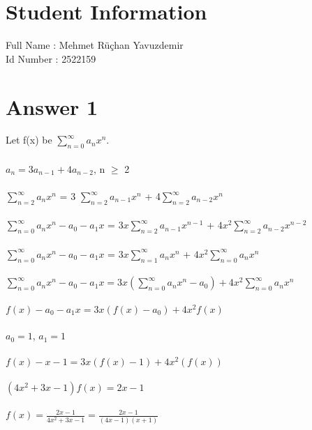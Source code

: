 \documentclass[12pt]{article}
\begin{document}
\section*{Student Information } 

Full Name : Mehmet Rüçhan Yavuzdemir \\
Id Number : 2522159 \\

\section*{Answer 1}

Let f(x) be  $\sum_{n=0}^{\infty} a_n x^n$.\\\\

$a_n = 3a_{n-1} + 4a_{n-2}$, n $\geq$ 2\\\\

$\sum_{n=2}^{\infty} a_n x^n$ = 3 $\sum_{n=2}^{\infty} a_{n-1}x^n$ + 4$\sum_{n=2}^{\infty} a_{n-2} x^n$\\\\

$\sum_{n=0}^{\infty} a_n x^n - a_0 - a_1x$  = $3x \sum_{n=2}^{\infty} a_{n-1}x^{n-1}$ + $4x^2\sum_{n=2}^{\infty} a_{n-2} x^{n-2}$\\\\

$\sum_{n=0}^{\infty} a_n x^n - a_0 - a_1x$  = $3x \sum_{n=1}^{\infty} a_{n}x^{n}$ + $4x^2\sum_{n=0}^{\infty} a_{n} x^{n}$\\\\

$\sum_{n=0}^{\infty} a_n x^n- a_0 - a_1x = 3x(\sum_{n=0}^{\infty} a_n x^n-a_0) + 4x^2\sum_{n=0}^{\infty} a_n x^n$\\\\

$f(x)- a_0 - a_1x = 3x(f(x)-a_0) + 4x^2f(x)$\\\\

$a_0 = 1$, $a_1 = 1$\\\\

$f(x) -x -1= 3x(f(x)-1) + 4x^2(f(x))$\\\\

$(4x^2 +3x -1)f(x) = 2x-1$\\\\

$f(x) = \frac{2x-1}{4x^2 +3x -1} = \frac{2x-1}{(4x-1)(x+1)}$\\\\
\end{document}
